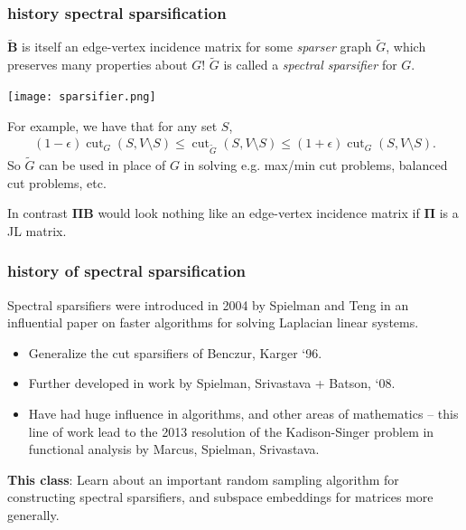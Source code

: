\documentclass[compress]{beamer}
\newcommand{\bs}[1]{\boldsymbol{#1}}
\newcommand{\bv}[1]{\mathbf{#1}}
\DeclareMathOperator{\cut}{cut}
\begin{document}
\begin{frame}
	\frametitle{history spectral sparsification}
	$\tilde{\bv{B}}$ is itself an edge-vertex incidence matrix for some 
\emph{sparser} graph $\tilde{G}$, which preserves many properties about $G$!  $\tilde{G}$ is called a \emph{spectral sparsifier} for $G$.
\vspace{-1em}

	\begin{center}
		\texttt{[image: sparsifier.png]}
	\end{center}

\vspace{-1em}
  For example, we have that for any set $S$, 
	\begin{align*}
		(1-\epsilon)\cut_{{G}}(S,V\setminus S) \leq \cut_{\tilde{G}}(S,V\setminus S) \leq (1+\epsilon)\cut_{{G}}(S,V\setminus S).
	\end{align*}
So $\tilde{G}$ can be used in place of $G$ in solving e.g. max/min cut problems, balanced cut problems, etc. 

\vspace{-1em}
\begin{center}
	\alert{In contrast $\bs{\Pi} \bv{B}$ would look nothing like an edge-vertex incidence matrix if $\bs{\Pi}$ is a JL matrix. }
\end{center}
\end{frame}


\begin{frame}[t]
	\frametitle{history of spectral sparsification}
	Spectral sparsifiers were introduced in 2004 by Spielman and Teng in an influential paper on faster algorithms for solving Laplacian linear systems. 
	\begin{itemize}
		\item Generalize the cut sparsifiers of Benczur, Karger `96. 
		\item Further developed in work by Spielman, Srivastava + Batson, `08.
		\item Have had huge influence in algorithms, and other areas of mathematics -- this line of work lead to the 2013 resolution of the Kadison-Singer problem in functional analysis by Marcus, Spielman, Srivastava. 
	\end{itemize}
	\alert{\textbf{This class}: Learn about an important random sampling algorithm for constructing spectral sparsifiers, and subspace embeddings for matrices more generally.}
\end{frame}
\end{document}
